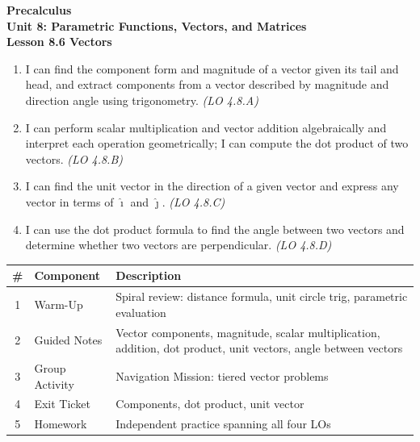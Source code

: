 \documentclass[10pt]{article}
\begin{document}
\vspace{-0.8in}

\begin{center}
  {\color{white}\textbf{\LARGE Precalculus}}\\[4pt]
  {\color{skymid}\large\textbf{Unit 8: Parametric Functions, Vectors, and Matrices}}\\[6pt]
  {\color{white}\textbf{\large Lesson 8.6 \quad Vectors}}
\end{center}

\vspace{0.22in}
\namedateperiod
\vspace{0.18in}

\begin{learningtargetbox}
\small
\begin{enumerate}[leftmargin=1.5em, itemsep=5pt]
  \item I can find the component form and magnitude of a vector given its tail
    and head, and extract components from a vector described by magnitude and
    direction angle using trigonometry. \textit{(LO 4.8.A)}
  \item I can perform scalar multiplication and vector addition algebraically
    and interpret each operation geometrically; I can compute the dot product
    of two vectors. \textit{(LO 4.8.B)}
  \item I can find the unit vector in the direction of a given vector and express
    any vector in terms of $\hat{\imath}$ and $\hat{\jmath}$. \textit{(LO 4.8.C)}
  \item I can use the dot product formula to find the angle between two vectors
    and determine whether two vectors are perpendicular. \textit{(LO 4.8.D)}
\end{enumerate}
\end{learningtargetbox}

\vspace{0.14in}

\begin{tocbox}
\small
\renewcommand{\arraystretch}{1.5}
\begin{tabularx}{\linewidth}{@{} c l X @{}}
\rowcolor{sky}
\textbf{\#} & \textbf{Component} & \textbf{Description} \\
\midrule
1 & Warm-Up        & Spiral review: distance formula, unit circle trig, parametric evaluation \\
2 & Guided Notes   & Vector components, magnitude, scalar multiplication, addition, dot product, unit vectors, angle between vectors \\
3 & Group Activity & Navigation Mission: tiered vector problems \\
4 & Exit Ticket    & Components, dot product, unit vector \\
5 & Homework       & Independent practice spanning all four LOs \\
\end{tabularx}
\end{tocbox}
\end{document}

